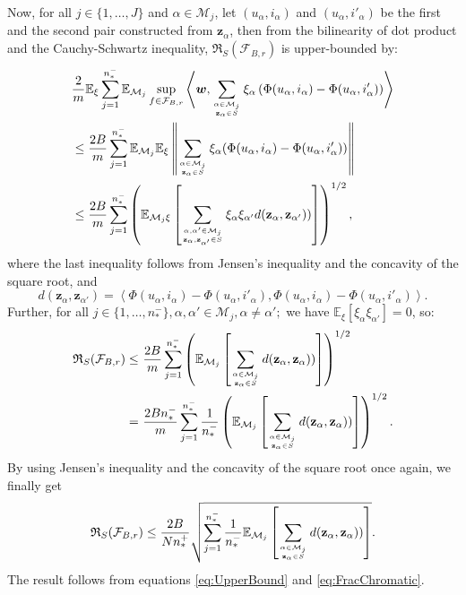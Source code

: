 \documentclass[10pt,journal,compsoc]{IEEEtran}
\newcommand{\Cset}{\mathcal M}
\newcommand{\bfZ}{\mathbf{z}}
\newcommand{\rademacher}{\mathfrak{R}}
\begin{document}
\begin{sloppypar}
\begin{IEEEproof}
Now, for all $j\in\{1,\ldots,J\}$ and $\alpha \in \mathcal M_j$, let $(u_\alpha,i_\alpha)$ and $(u_\alpha,i'_\alpha)$ be the first and the second pair constructed from $\bfZ_\alpha$, then from the bilinearity of dot product and the Cauchy-Schwartz inequality, $\rademacher_{S}(\mathcal{F}_{B,r})$ is upper-bounded by:
\begin{align}
&\frac{2}{m}\mathbb{E}_{\xi}\sum_{j=1}^{n_*^-}\mathbb{E}_{\Cset_j}\sup_{f\in\mathcal{F}_{B,r}} \left\langle \boldsymbol{w},\sum_{\alpha\in\Cset_j \atop \bfZ_\alpha \in S}\xi_\alpha\left( \Phi(u_\alpha,i_\alpha)-\Phi(u_\alpha,i'_\alpha)\right)\right\rangle \nonumber\\
     & \le  \frac{2B}{m}\sum_{j=1}^{n_*^-}\mathbb{E}_{\Cset_j} \mathbb{E}_{\xi}\left\|  \sum_{\alpha\in\Cset_j \atop \bfZ_\alpha \in S}\xi_\alpha(\Phi(u_\alpha,i_\alpha)-\Phi(u_\alpha,i'_\alpha))\right\| \nonumber \\
     & \le \frac{2B}{m}\sum_{j=1}^{n_*^-}\left(\mathbb{E}_{\Cset_j \xi}\left[  \sum_{\alpha,\alpha'\in\Cset_j \atop \bfZ_\alpha,\bfZ_{\alpha'} \in S}\xi_\alpha\xi_{\alpha'}d(\bfZ_\alpha,\bfZ_{\alpha'}))\right]\right)^{1/2},
\end{align}
where the last inequality follows from Jensen's inequality and the concavity of the square root, and
\[
d(\bfZ_\alpha,\bfZ_{\alpha'})=\left\langle \Phi(u_\alpha,i_\alpha)-\Phi(u_\alpha,i'_\alpha),\Phi(u_\alpha,i_\alpha)-\Phi(u_\alpha,i'_\alpha)\right\rangle.
\]
Further, for all $j\in\{1,\ldots,n^-_*\}, \alpha,\alpha' \in \mathcal M_j, \alpha\neq \alpha'; $ we have $\mathbb{E}_\xi[\xi_\alpha \xi_{\alpha'}]=0$, \cite[p. 91]{Shawe-Taylor:2004:KMP:975545} so:
\begin{align*}
\rademacher_{S}(\mathcal{F}_{B,r})\le & ~\frac{2B}{m}\sum_{j=1}^{n_*^-}\left(\mathbb{E}_{\Cset_j}\left[  \sum_{\alpha\in\Cset_j \atop \bfZ_\alpha \in S}d(\bfZ_\alpha,\bfZ_{\alpha}))\right]\right)^{1/2}\\
= &~ \frac{2Bn^-_*}{m}\sum_{j=1}^{n_*^-}\frac{1}{n^-_*}\left(\mathbb{E}_{\Cset_j}\left[  \sum_{\alpha\in\Cset_j \atop \bfZ_\alpha \in S}d(\bfZ_\alpha,\bfZ_{\alpha}))\right]\right)^{1/2}.
\end{align*}
By using Jensen's inequality and the concavity of the square root once again, we finally get
\begin{equation}
\label{eq:FracChromatic}
\rademacher_{S}(\mathcal{F}_{B,r})\le
\frac{2B}{Nn^+_*}\sqrt{\sum_{j=1}^{n_*^-}\frac{1}{n^-_*}\mathbb{E}_{\Cset_j}\left[  \sum_{\alpha\in\Cset_j \atop \bfZ_\alpha \in S}d(\bfZ_\alpha,\bfZ_{\alpha}))\right]}.
\end{equation}
The result follows from equations \eqref{eq:UpperBound} and \eqref{eq:FracChromatic}.
\end{IEEEproof}


\end{sloppypar}
\end{document}
